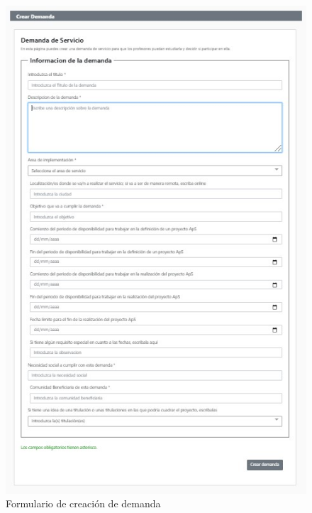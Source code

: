 \documentclass[11pt]{book}
\begin{document}
	\begin{figure}[t]
		\centering
		\includegraphics[scale=0.9]{demanda}
		\caption{Formulario de creación de demanda}
	\end{figure}
\end{document}
